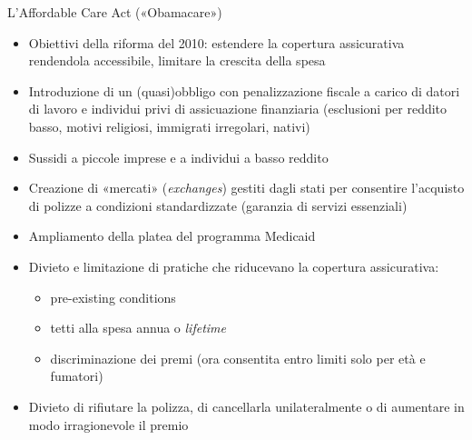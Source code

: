 \documentclass[aspectratio=64,12pt]{beamer}
\begin{document}
\begin{frame}{L'Affordable Care Act («Obamacare»)}
\begin{resize}{0.9}
\begin{itemize}
\item Obiettivi della riforma del 2010: estendere la copertura assicurativa
rendendola accessibile, limitare la crescita della spesa
\item Introduzione di un (quasi)obbligo con penalizzazione fiscale a carico di
datori di lavoro e individui privi di assicuazione finanziaria (esclusioni
per reddito basso, motivi religiosi, immigrati irregolari, nativi)
\item Sussidi a piccole imprese e a individui a basso reddito
\item Creazione di «mercati» (\emph{exchanges}) gestiti dagli stati per consentire
l'acquisto di polizze a condizioni standardizzate (garanzia di servizi
essenziali)
\item Ampliamento della platea del programma Medicaid
\item Divieto e limitazione di pratiche che riducevano la copertura assicurativa:
\begin{itemize}
\item pre-existing conditions
\item tetti alla spesa annua o \emph{lifetime}
\item discriminazione dei premi (ora consentita entro limiti solo per età e
fumatori)
\end{itemize}
\item Divieto di rifiutare la polizza, di cancellarla unilateralmente o di
aumentare in modo irragionevole il premio
\end{itemize}
\end{resize}
\end{frame}
\end{document}
